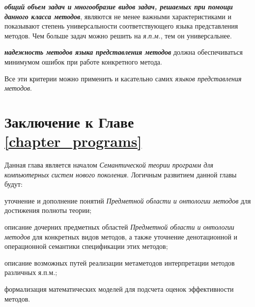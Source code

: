 \textbf{\textit{общий объем задач и многообразие видов задач, решаемых при помощи данного класса методов}}, являются не менее важными характеристиками и показывают степень универсальности соответствующего языка представления методов. Чем больше задач можно решить на \textit{я.п.м.}, тем он универсальнее.

\textbf{\textit{надежность методов языка представления методов}} должна обеспечиваться минимумом ошибок при работе конкретного метода.

Все эти критерии можно применить и касательно самих \textit{языков представления методов}.

\section*{Заключение к Главе \ref{chapter_programs}}

Данная глава является началом \textit{Семантической теории программ для компьютерных систем нового поколения}. Логичным развитием данной главы будут:

\begin{textitemize}
    \item уточнение и дополнение понятий \textit{Предметной области и онтологии методов} для достижения полноты теории;
    \item описание дочерних предметных областей \textit{Предметной области и онтологии методов} для конкретных видов методов, а также уточнение денотационной и операционной семантики спецификации этих методов;
    \item описание возможных путей реализации метаметодов интерпретации методов различных я.п.м.;
    \item формализация математических моделей для подсчета оценок эффективности методов.
\end{textitemize}

